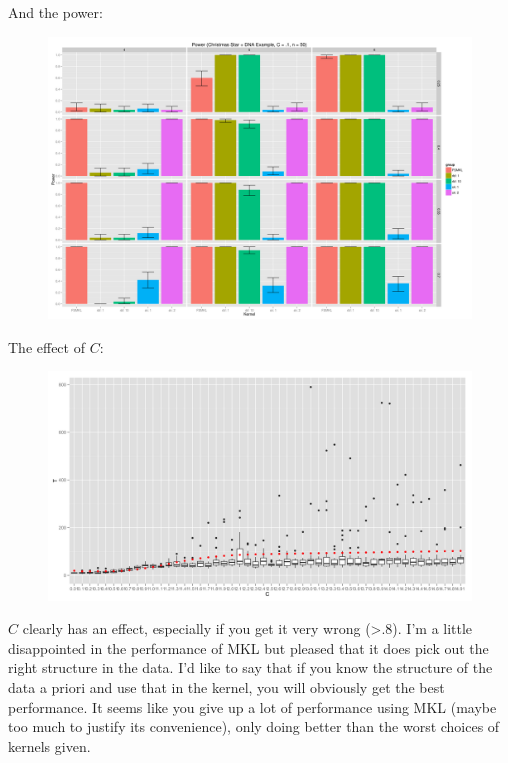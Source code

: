 And the power:
\begin{figure}[!ht]
  \centering
    \includegraphics[scale=.3]{power_christmas_star_DNA_facet4.png}
\end{figure}

The effect of $C$:
\begin{figure}[!ht]
  \centering
      \includegraphics[scale=.1]{tstat_on_c.png}
\end{figure}

$C$ clearly has an effect, especially if you get it very wrong (>.8).
I'm a little disappointed in the performance of MKL but pleased that
it does pick out the right structure in the data.  I'd like to say
that if you know the structure of the data a priori and use that in
the kernel, you will obviously get the best performance.  It seems
like you give up a lot of performance using MKL (maybe too much to
justify its convenience), only doing better than the worst choices of
kernels given.

